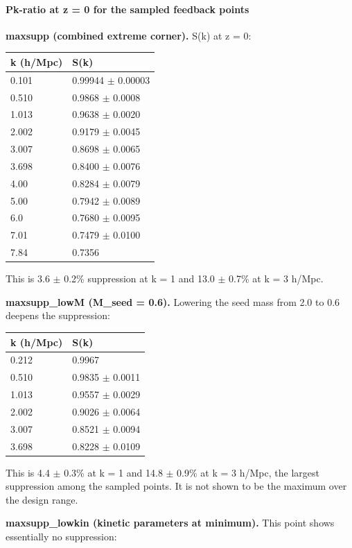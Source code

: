 \documentclass[11pt,a4paper]{article}
\begin{document}
\paragraph{Pk-ratio at z = 0 for the sampled feedback points}
\textbf{maxsupp (combined extreme corner).} S(k) at z = 0:

\begin{longtable}{@{}p{}p{}@{}}
\toprule
\textbf{k (h/Mpc)} & \textbf{S(k)} \\ \midrule \endhead
0.101 & 0.99944 $\pm$ 0.00003 \\
0.510 & 0.9868 $\pm$ 0.0008 \\
1.013 & 0.9638 $\pm$ 0.0020 \\
2.002 & 0.9179 $\pm$ 0.0045 \\
3.007 & 0.8698 $\pm$ 0.0065 \\
3.698 & 0.8400 $\pm$ 0.0076 \\
4.00 & 0.8284 $\pm$ 0.0079 \\
5.00 & 0.7942 $\pm$ 0.0089 \\
6.0 & 0.7680 $\pm$ 0.0095 \\
7.01 & 0.7479 $\pm$ 0.0100 \\
7.84 & 0.7356 \\
\bottomrule\end{longtable}
This is 3.6 $\pm$ 0.2\% suppression at k = 1 and 13.0 $\pm$ 0.7\% at k = 3 h/Mpc.

\textbf{maxsupp\_lowM (M\_seed = 0.6).} Lowering the seed mass from 2.0 to 0.6 deepens the suppression:

\begin{longtable}{@{}p{}p{}@{}}
\toprule
\textbf{k (h/Mpc)} & \textbf{S(k)} \\ \midrule \endhead
0.212 & 0.9967 \\
0.510 & 0.9835 $\pm$ 0.0011 \\
1.013 & 0.9557 $\pm$ 0.0029 \\
2.002 & 0.9026 $\pm$ 0.0064 \\
3.007 & 0.8521 $\pm$ 0.0094 \\
3.698 & 0.8228 $\pm$ 0.0109 \\
\bottomrule\end{longtable}
This is 4.4 $\pm$ 0.3\% at k = 1 and 14.8 $\pm$ 0.9\% at k = 3 h/Mpc, the largest suppression among the sampled points. It is not shown to be the maximum over the design range.

\textbf{maxsupp\_lowkin (kinetic parameters at minimum).} This point shows essentially no suppression:
\end{document}
